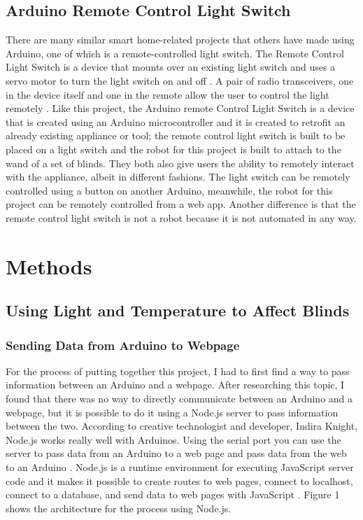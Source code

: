\documentclass[10pt,twocolumn]{article}
\begin{document}
\subsection{Arduino Remote Control Light Switch}
There are many similar smart home-related projects that others have made using Arduino, one of which is a remote-controlled light switch. The Remote Control Light Switch is a device that mounts over an existing light switch and uses a servo motor to turn the light switch on and off \cite{MerrittRemoteControlLightSwitch}. A pair of radio transceivers, one in the device itself and one in the remote allow the user to control the light remotely \cite{MerrittRemoteControlLightSwitch}. Like this project, the Arduino remote Control Light Switch is a device that is created using an Arduino microcontroller and it is created to retrofit an already existing appliance or tool; the remote control light switch is built to be placed on a light switch and the robot for this project is built to attach to the wand of a set of blinds. They both also give users the ability to remotely interact with the appliance, albeit in different fashions. The light switch can be remotely controlled using a button on another Arduino, meanwhile, the robot for this project can be remotely controlled from a web app. Another difference is that the remote control light switch is not a robot because it is not automated in any way.


\section{Methods}
\subsection{Using Light and Temperature to Affect Blinds}
\subsubsection{Sending Data from Arduino to Webpage}
For the process of putting together this project, I had to first find a way to pass information between an Arduino and a webpage. After researching this topic, I found that there was no way to directly communicate between an Arduino and a webpage, but it is possible to do it using a Node.js server to pass information between the two. According to creative technologist and developer, Indira Knight, Node.js works really well with Arduinos. Using the serial port you can use the server to pass data from an Arduino to a web page and pass data from the web to an Arduino \cite{Knight2018ConnectingArduino}. Node.js is a runtime environment for executing JavaScript server code and it makes it possible to create routes to web pages, connect to localhost, connect to a database, and send data to web pages with JavaScript \cite{Knight2018ConnectingArduino}. Figure 1 shows  the architecture for the process using Node.js.
\end{document}

